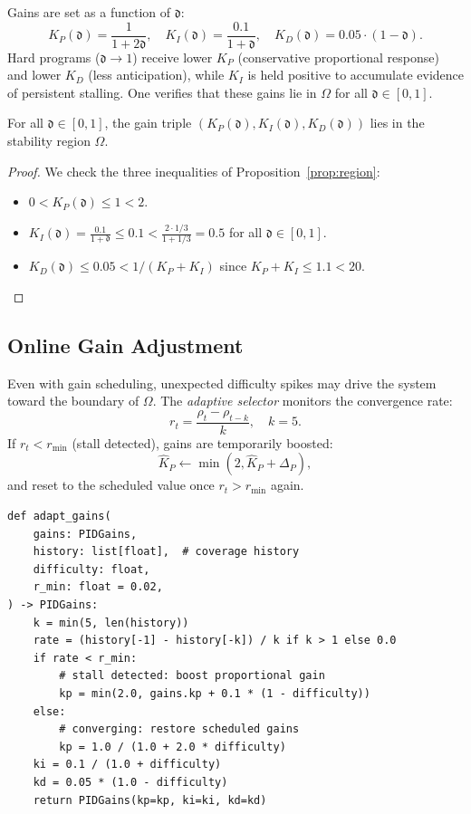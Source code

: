 \documentclass[11pt]{article}
\newcommand{\vcov}{\rho}                   %
\newcommand{\Kp}{K_P}                      %
\newcommand{\Ki}{K_I}                      %
\newcommand{\Kd}{K_D}                      %
\newcommand{\GainRegion}{\Omega}           %
\newcommand{\AdaptiveGain}{\hat{K}}        %
\newcommand{\difficulty}{\mathfrak{d}}     %
\begin{document}
Gains are set as a function of $\difficulty$:
\[
  \Kp(\difficulty) = \frac{1}{1 + 2\difficulty},\quad
  \Ki(\difficulty) = \frac{0.1}{1 + \difficulty},\quad
  \Kd(\difficulty) = 0.05 \cdot (1 - \difficulty).
\]
Hard programs ($\difficulty \to 1$) receive lower $\Kp$ (conservative
proportional response) and lower $\Kd$ (less anticipation), while $\Ki$
is held positive to accumulate evidence of persistent stalling.  One
verifies that these gains lie in $\GainRegion$ for all
$\difficulty \in [0,1]$.

\begin{proposition}
  \label{prop:sched}
  For all $\difficulty \in [0,1]$, the gain triple
  $(\Kp(\difficulty), \Ki(\difficulty), \Kd(\difficulty))$
  lies in the stability region $\GainRegion$.
\end{proposition}
\begin{proof}
  We check the three inequalities of Proposition~\ref{prop:region}:
  \begin{itemize}
    \item $0 < \Kp(\difficulty) \leq 1 < 2$.\;\checkmark
    \item $\Ki(\difficulty) = \tfrac{0.1}{1+\difficulty}
          \leq 0.1 < \tfrac{2 \cdot 1/3}{1+1/3} = 0.5$
          for all $\difficulty \in [0,1]$.\;\checkmark
    \item $\Kd(\difficulty) \leq 0.05 < 1/(\Kp + \Ki)$
          since $\Kp + \Ki \leq 1.1 < 20$.\;\checkmark
  \end{itemize}
\end{proof}

\subsection{Online Gain Adjustment}

Even with gain scheduling, unexpected difficulty spikes may drive the
system toward the boundary of $\GainRegion$.  The \emph{adaptive
selector} monitors the convergence rate:
\[
  r_t = \frac{\vcov_t - \vcov_{t-k}}{k}, \quad k = 5.
\]
If $r_t < r_{\min}$ (stall detected), gains are temporarily boosted:
\[
  \AdaptiveGain_P \leftarrow \min(2, \AdaptiveGain_P + \Delta_P),
\]
and reset to the scheduled value once $r_t > r_{\min}$ again.

\begin{lstlisting}[style=jugeo-python,
  caption={Online gain adaptation.}]
def adapt_gains(
    gains: PIDGains,
    history: list[float],  # coverage history
    difficulty: float,
    r_min: float = 0.02,
) -> PIDGains:
    k = min(5, len(history))
    rate = (history[-1] - history[-k]) / k if k > 1 else 0.0
    if rate < r_min:
        # stall detected: boost proportional gain
        kp = min(2.0, gains.kp + 0.1 * (1 - difficulty))
    else:
        # converging: restore scheduled gains
        kp = 1.0 / (1.0 + 2.0 * difficulty)
    ki = 0.1 / (1.0 + difficulty)
    kd = 0.05 * (1.0 - difficulty)
    return PIDGains(kp=kp, ki=ki, kd=kd)
\end{lstlisting}
\end{document}
